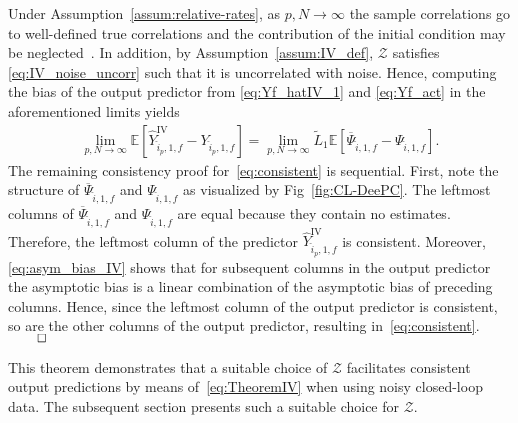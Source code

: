 Under Assumption~\ref{assum:relative-rates}, as $p,N\rightarrow\infty$ the sample correlations go to well-defined true correlations and the contribution of the initial condition may be neglected~\citep{Bauer2002,Chiuso2006}. In addition, by Assumption~\ref{assum:IV_def}, $\mathcal{Z}$ satisfies \eqref{eq:IV_noise_uncorr} such that it is uncorrelated with noise. Hence, computing the bias of the output predictor from \eqref{eq:Yf_hatIV_1} and \eqref{eq:Yf_act} in the aforementioned limits yields
\begin{align}\label{eq:asym_bias_IV}
    \lim_{p,N\rightarrow\infty}\!\!\mathbb{E}\left[\widehat{Y}_{\hat{i}_p,1,f}^\mathrm{IV}-Y_{\hat{i}_p,1,f}\right]\!=\!\!\lim_{p,N\rightarrow\infty}\!\!\widetilde{L}_1\mathbb{E}\left[\overline{\Psi}_{\hat{i},1,f}-\Psi_{\hat{i},1,f}\right]\!.
\end{align}
The remaining consistency proof for~\eqref{eq:consistent} is sequential. First, note the structure of $\overline{\Psi}_{\hat{i},1,f}$ and $\Psi_{\hat{i},1,f}$ as visualized by Fig~\ref{fig:CL-DeePC}. The leftmost columns of $\overline{\Psi}_{\hat{i},1,f}$ and $\Psi_{\hat{i},1,f}$ are equal because they contain no estimates. Therefore, the leftmost column of the predictor $\widehat{Y}_{\hat{i}_p,1,f}^\mathrm{IV}$ is consistent. Moreover, \eqref{eq:asym_bias_IV} shows that for subsequent columns in the output predictor the asymptotic bias is a linear combination of the asymptotic bias of preceding columns. Hence, since the leftmost column of the output predictor is consistent, so are the other columns of the output predictor, resulting in~\eqref{eq:consistent}. $\hfill\qed$

This theorem demonstrates that a suitable choice of $\mathcal{Z}$ facilitates consistent output predictions by means of~\eqref{eq:TheoremIV} when using noisy closed-loop data. The subsequent section presents such a suitable choice for $\mathcal{Z}$.


